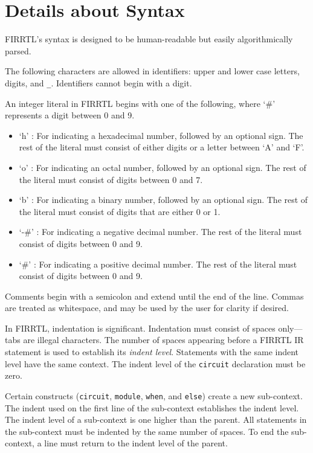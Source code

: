 \documentclass[12pt]{article}
\begin{document}
\section{Details about Syntax}

FIRRTL's syntax is designed to be human-readable but easily algorithmically parsed.

The following characters are allowed in identifiers: upper and lower case letters, digits, and \verb|_|. Identifiers cannot begin with a digit.

An integer literal in FIRRTL begins with one of the following, where `\#' represents a digit between 0 and 9.
\begin{itemize}
\item `h' : For indicating a hexadecimal number, followed by an optional sign. The rest of the literal must consist of either digits or a letter between `A' and `F'.
\item `o' : For indicating an octal number, followed by an optional sign. The rest of the literal must consist of digits between 0 and 7.
\item `b' : For indicating a binary number, followed by an optional sign. The rest of the literal must consist of digits that are either 0 or 1.
\item `-\#' : For indicating a negative decimal number. The rest of the literal must consist of digits between 0 and 9.
\item `\#' : For indicating a positive decimal number. The rest of the literal must consist of digits between 0 and 9.
\end{itemize}

Comments begin with a semicolon and extend until the end of the line. Commas are treated as whitespace, and may be used by the user for clarity if desired.

In FIRRTL, indentation is significant.
Indentation must consist of spaces only---tabs are illegal characters.
The number of spaces appearing before a FIRRTL IR statement is used to establish its \emph{indent level}.
Statements with the same indent level have the same context.
The indent level of the \verb|circuit| declaration must be zero.

Certain constructs (\verb|circuit|, \verb|module|, \verb|when|, and \verb|else|) create a new sub-context.
The indent used on the first line of the sub-context establishes the indent level.
The indent level of a sub-context is one higher than the parent.
All statements in the sub-context must be indented by the same number of spaces.
To end the sub-context, a line must return to the indent level of the parent.
\end{document}
